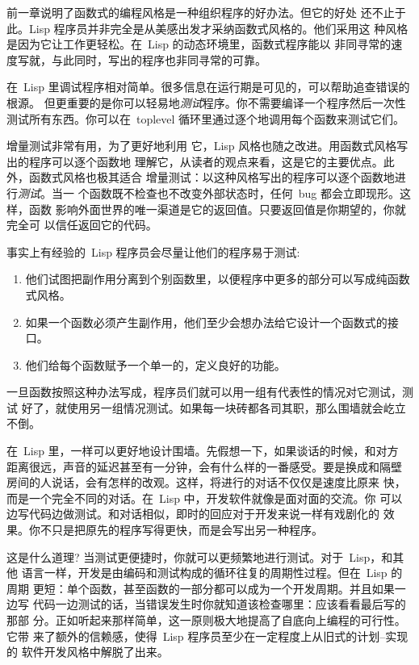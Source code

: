 前一章说明了函数式的编程风格是一种组织程序的好办法。但它的好处
还不止于此。Lisp 程序员并非完全是从美感出发才采纳函数式风格的。他们采用这
种风格是因为它让工作更轻松。在~Lisp 的动态环境里，函数式程序能以
非同寻常的速度写就，与此同时，写出的程序也非同寻常的可靠。

在~Lisp 里调试程序相对简单。很多信息在运行期是可见的，可以帮助追查错误的根源。
但更重要的是你可以轻易地\emph{测试}程序。你不需要编译一个程序然后一次性
测试所有东西。你可以在~toplevel 循环里通过逐个地调用每个函数来测试它们。

增量测试非常有用，为了更好地利用
它，Lisp 风格也随之改进。用函数式风格写出的程序可以逐个函数地
理解它，从读者的观点来看，这是它的主要优点。此外，函数式风格也极其适合
增量测试：以这种风格写出的程序可以逐个函数地进行\emph{测试}。当一
个函数既不检查也不改变外部状态时，任何~bug 都会立即现形。这样，函数
影响外面世界的唯一渠道是它的返回值。只要返回值是你期望的，你就完全可
以信任返回它的代码。

事实上有经验的~Lisp 程序员会尽量让他们的程序易于测试:
\begin{enumerate}
\item 他们试图把副作用分离到个别函数里，以便程序中更多的部分可以写成纯函数式风格。
\item 如果一个函数必须产生副作用，他们至少会想办法给它设计一个函数式的接口。
\item 他们给每个函数赋予一个单一的，定义良好的功能。
\end{enumerate}
一旦函数按照这种办法写成，程序员们就可以用一组有代表性的情况对它测试，测试
好了，就使用另一组情况测试。如果每一块砖都各司其职，那么围墙就会屹立不倒。

在~Lisp 里，一样可以更好地设计围墙。先假想一下，如果谈话的时候，和对方
距离很远，声音的延迟甚至有一分钟，会有什么样的一番感受。要是换成和隔壁
房间的人说话，会有怎样的改观。这样，将进行的对话不仅仅是速度比原来
快，而是一个完全不同的对话。在~Lisp 中，开发软件就像是面对面的交流。你
可以边写代码边做测试。和对话相似，即时的回应对于开发来说一样有戏剧化的
效果。你不只是把原先的程序写得更快，而是会写出另一种程序。

这是什么道理? 当测试更便捷时，你就可以更频繁地进行测试。对于~Lisp，和其他
语言一样，开发是由编码和测试构成的循环往复的周期性过程。但在~Lisp 的周期
更短：单个函数，甚至函数的一部分都可以成为一个开发周期。并且如果一边写
代码一边测试的话，当错误发生时你就知道该检查哪里：应该看看最后写的那部
分。正如听起来那样简单，这一原则极大地提高了自底向上编程的可行性。它带
来了额外的信赖感，使得~Lisp 程序员至少在一定程度上从旧式的计划--实现的
软件开发风格中解脱了出来。


